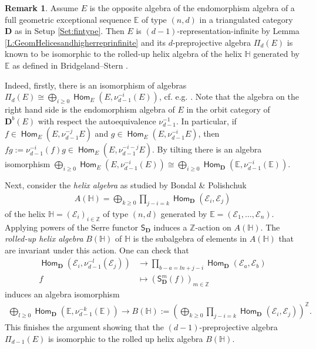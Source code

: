 \documentclass[a4paper,11pt, reqno]{amsart}
\def\E{\mathbb E}
\def\H{\mathbb H}
\def\Z{\mathbb Z}
\def\DD{\mathbf D}
\def\cd{\mathbf D}
\def\sE{\mathscr{E}}
\newcommand{\opname}[1]{\operatorname{\mathsf{#1}}}
\newcommand{\Hom}{\opname{Hom}}
\def\Db{\DD^b}
\newcommand{\bS}{\mathsf{S}}
\theoremstyle{plain}
\theoremstyle{definition}
\newtheorem{remark}[dummy]{Remark}
\numberwithin{equation}{section}
\begin{document}
\begin{remark}\label{rem:rolled-up}
    Assume $E$ is the opposite algebra of the endomorphism algebra of a full geometric  exceptional sequence $\mathbb{E}$ of type $(n, d)$ in a triangulated category $\cd$ as in Setup \ref{Set:fintype}. Then $E$ is $(d-1)$-representation-infinite by Lemma \ref{L:GeomHelicesandhigherreprinfinite} and its $d$-preprojective algebra $\Pi_d(E)$ is known to be isomorphic to the rolled-up helix algebra of the helix $\H$ generated by $\E$ as defined in Bridgeland--Stern \cite[Section 3.2.]{BridgelandStern}. 
    
    Indeed, firstly, there is an isomorphism of algebras
    $\Pi_d(E) \cong  \bigoplus_{i\geq 0} \Hom_E(E, \nu_{d-1}^{-i}(E)) $, cf. e.g. \cite[Lemma 2.13]{IyamaOppermann}.
    Note that the algebra on the right hand side is the endomorphism algebra of $E$ in the orbit category of $\Db(E)$ with respect the autoequivalence $\nu_{d-1}^{-1}$. In particular, if $f \in \Hom_E(E, \nu_{d-1}^{-j} E)$ and $g \in \Hom_E(E, \nu_{d-1}^{-i} E)$, then $fg:= \nu_{d-1}^{-i}(f)g \in \Hom_E(E, \nu_{d-1}^{-i-j} E)$. By tilting there is an algebra isomorphism $\bigoplus_{i\geq 0} \Hom_E(E, \nu_{d-1}^{-i}(E)) \cong \bigoplus_{i\geq 0} \Hom_\cd(\E, \nu_{d-1}^{-i}(\E))$.

    Next, consider the \emph{helix algebra} as studied by Bondal \& Polishchuk \cite{bondal-polishchuk}
    \begin{align}
       A(\H) = \bigoplus_{k \geq 0} \prod_{j-i=k} \Hom_\cd(\sE_i, \sE_j) 
    \end{align}
     of the helix $\H = (\sE_i)_{i \in \Z}$ of type $(n, d)$ generated by $\E=(\sE_1, \ldots, \sE_n)$. Applying powers of the Serre functor $\bS_\cd$ induces a $\Z$-action on $A(\H)$. The \emph{rolled-up helix algebra} $B(\H)$  of $\H$ is the subalgebra of elements in $A(\H)$ that are invariant under this action. One can check that
     \begin{align}
         \Hom_\cd(\sE_i, \nu_{d-1}^{-l}(\sE_j))  &\to \prod_{b-a=ln+j-i} \Hom_\cd(\sE_a, \sE_b) \\
         f &\mapsto (\bS_{\cd}^m(f))_{m \in \Z}
          \end{align}
     induces an algebra isomorphism
     \begin{align}
     \bigoplus_{l\geq 0} \Hom_\cd(\E, \nu_{d-1}^{-k}(\E))  \to B(\H):= \left(\bigoplus_{k \geq 0} \prod_{j-i=k} \Hom_\cd(\sE_i, \sE_j)\right)^\Z.  
     \end{align}
     This finishes the argument showing that the $(d-1)$-preprojective algebra $\Pi_{d-1}(E)$ is isomorphic to the rolled up helix algebra $B(\H)$.
\end{remark}
\end{document}
